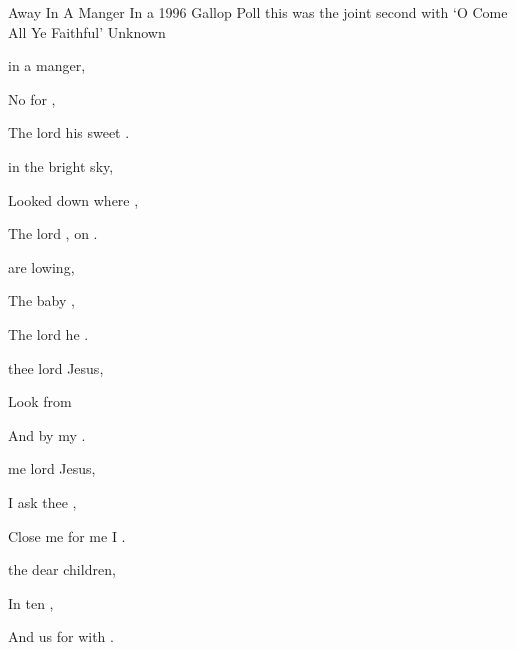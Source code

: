 \begin{SBSong}{Away In A Manger}  
    {In a 1996 Gallop Poll this was the joint second with `O Come All Ye Faithful'}
    {Unknown}
  \begin{SBVerse}
	 in a manger,
	
	No  for  ,
	
	The  lord    his sweet .
	
	  in the bright sky,
	
	Looked down where  ,
	
	The  lord ,  on  .
  \end{SBVerse}
  \begin{SBVerse}
	  are lowing,
	
	The baby ,
	
	The  lord    he .
	
	  thee lord Jesus,
	
	Look  from  
	
	And  by my     .
  \end{SBVerse}
  \begin{SBVerse}
	  me lord Jesus,
	
	I ask thee  ,
	
	Close  me for    me I .
	
	  the dear children,
	
	In  ten ,
	
	And  us for    with  .
  \end{SBVerse}
\end{SBSong}
